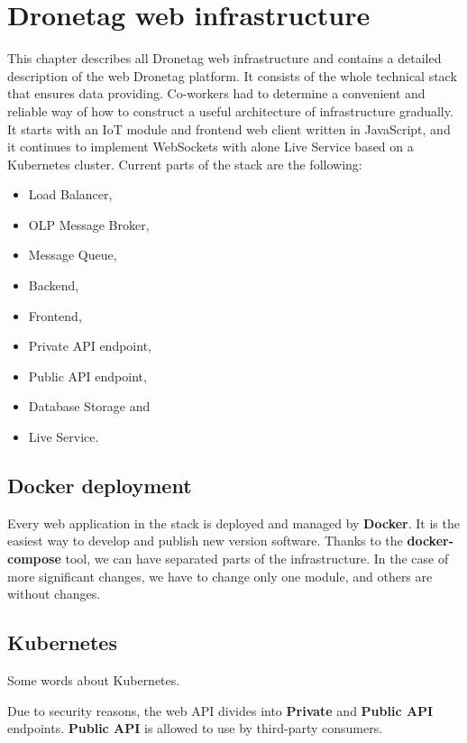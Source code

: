 \chapter{Dronetag web infrastructure}\label{ch:dronetag-web-infrastructure}
This chapter describes all Dronetag web infrastructure and contains a detailed description of the web Dronetag platform.
It consists of the whole technical stack that ensures data providing.
Co-workers had to determine a convenient and reliable way of how to construct a useful architecture of infrastructure gradually.
It starts with an IoT module and frontend web client written in JavaScript, and it continues to implement WebSockets with alone Live Service based on a Kubernetes cluster.
Current parts of the stack are the following:
\begin{itemize}
    \item Load Balancer,
    \item OLP Message Broker,
    \item Message Queue,
    \item Backend,
    \item Frontend,
    \item Private API endpoint,
    \item Public API endpoint,
    \item Database Storage and
    \item Live Service.
\end{itemize}

\section{Docker deployment}\label{sec:docker-deployment}
Every web application in the stack is deployed and managed by \textbf{Docker}. %
It is the easiest way to develop and publish new version software.
Thanks to the \textbf{docker-compose} tool, we can have separated parts of the infrastructure.
In the case of more significant changes, we have to change only one module, and others are without changes.

\section{Kubernetes}\label{sec:kubernetes}
Some words about Kubernetes. %

Due to security reasons, the web API divides into \textbf{Private} and \textbf{Public API} endpoints.
\textbf{Public API} is allowed to use by third-party consumers.

